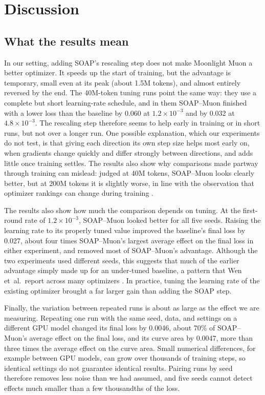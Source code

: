 \section{Discussion}
\label{sec:discussion}

\subsection{What the results mean}

In our setting, adding SOAP's rescaling step does not make Moonlight Muon a
better optimizer. It speeds up the start of training, but the advantage is
temporary, small even at its peak (about 1.5M tokens), and almost entirely
reversed by the end. The 40M-token tuning runs point the same way: they use a
complete but short learning-rate schedule, and in them SOAP--Muon finished with
a lower loss than the baseline by 0.060 at $1.2\times10^{-3}$ and by 0.032 at
$4.8\times10^{-3}$. The rescaling step therefore seems to help early in training
or in short runs, but not over a longer run. One possible explanation, which
our experiments do not test, is that giving each direction its own step size
helps most early on, when gradients change quickly and differ strongly between
directions, and adds little once training settles. The results also show why
comparisons made partway through training can mislead: judged at 40M tokens,
SOAP--Muon looks clearly better, but at 200M tokens it is slightly worse, in
line with the observation that optimizer rankings can change during training
\cite{wen2025fantastic}.

The results also show how much the comparison depends on tuning. At the
first-round rate of $1.2\times10^{-3}$, SOAP--Muon looked better for all five
seeds. Raising the learning rate to its properly tuned value improved the
baseline's final loss by 0.027, about four times SOAP--Muon's largest average
effect on the final loss in either experiment, and removed most of
SOAP--Muon's advantage. Although the two experiments used different seeds, this
suggests that much of the earlier advantage simply made up for an under-tuned
baseline, a pattern that Wen et~al.\ report across many optimizers
\cite{wen2025fantastic}. In practice, tuning the learning rate of the existing
optimizer brought a far larger gain than adding the SOAP step.

Finally, the variation between repeated runs is about as large as the effect we
are measuring. Repeating one run with the same seed, data, and settings on a
different GPU model changed its final loss by 0.0046, about 70\% of
SOAP--Muon's average effect on the final loss, and its curve area by 0.0047,
more than three times the average effect on the curve area. Small numerical
differences, for example between GPU models, can grow over thousands of
training steps, so identical settings do not guarantee identical results.
Pairing runs by seed therefore removes less noise than we had assumed, and five
seeds cannot detect effects much smaller than a few thousandths of the loss.


